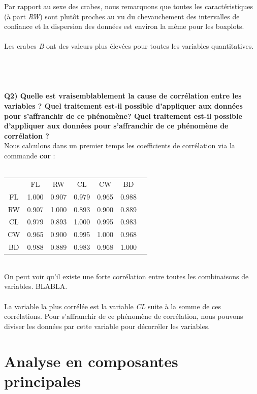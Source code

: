 \documentclass[a4paper, 9pt]{article}
\begin{document}
Par rapport au sexe des crabes, nous remarquons que toutes les caract\'eristiques (\`a part \textit{RW}) sont plut\^ot proches au vu
du chevauchement des intervalles de confiance et la dispersion des donn\'ees est environ la m\^eme pour les boxplots.\\ \\
Les crabes \textit{B} ont des valeurs plus \'elev\'ees pour toutes les variables quantitatives.\\ \\ \\ \\ \\
\textbf{Q2) Quelle est vraisemblablement la cause de corrélation entre les variables ? Quel traitement est-il possible d’appliquer aux données pour
s’affranchir de ce phénomène? Quel traitement est-il possible d'appliquer aux donn\'ees pour s'affranchir de ce ph\'enom\`ene de corr\'elation ?}\\
Nous calculons dans un premier temps les coefficients de corrélation via la commande \textbf{cor} :\\ \\
\begin{tabular}{|c|c|c|c|c|c|c|}
\hline
 & FL & RW & CL & CW & BD\\
FL & 1.000 & 0.907 & 0.979 & 0.965 & 0.988\\
\hline
RW & 0.907 & 1.000 & 0.893 & 0.900 & 0.889\\
\hline
CL & 0.979 & 0.893 & 1.000 & 0.995 & 0.983\\
\hline
CW & 0.965 & 0.900 & 0.995 & 1.000 & 0.968\\
\hline
BD & 0.988 & 0.889 & 0.983 & 0.968 & 1.000\\
\hline
\end{tabular}\\

On peut voir qu'il existe une forte corr\'elation entre toutes les combinaisons de variables.
BLABLA.\\ \\

La variable la plus corr\'el\'ee est la variable \textit{CL} suite à la somme de ces corr\'elations.
Pour s'affranchir de ce ph\'enom\`ene de corr\'elation, nous pouvons diviser les donn\'ees par cette variable pour d\'ecorr\'eler
les variables.

\newpage
\section{Analyse en composantes principales}
\end{document}
